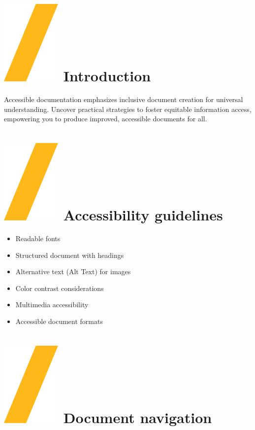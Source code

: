 \documentclass[a0paper,fleqn]{src/betterposter}
\begin{document}
{\section{\includegraphics[height=\fontcharht\font`\S]{img/general/slash.png} Introduction}
Accessible documentation emphasizes inclusive document creation for universal understanding. 
Uncover practical strategies to foster equitable information access, empowering you to produce 
improved, accessible documents for all.

\section{\includegraphics[height=\fontcharht\font`\S]{img/general/slash.png} Accessibility guidelines}

\begin{itemize}
\item Readable fonts
\item Structured document with headings
\item Alternative text (Alt Text) for images
\item Color contrast considerations
\item Multimedia accessibility
\item Accessible document formats
\end{itemize}

\section{\includegraphics[height=\fontcharht\font`\S]{img/general/slash.png} Document navigation}

}
\end{document}
